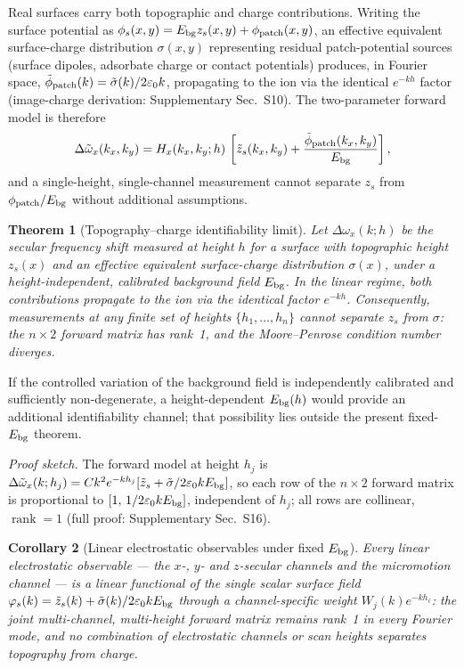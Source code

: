 \documentclass[12pt,a4paper]{article}
\newtheorem{theorem}{Theorem}[section]
\newtheorem{corollary}[theorem]{Corollary}
\begin{document}
Real surfaces carry both topographic and charge contributions.  Writing
the surface potential as
$\phi_s(x,y)=E_{\rm bg}z_s(x,y)+\phi_{\rm patch}(x,y)$, an effective
equivalent surface-charge distribution $\sigma(x,y)$ representing
residual patch-potential sources (surface dipoles, adsorbate charge or
contact potentials) produces, in Fourier space,
$\tilde{\phi}_{\rm patch}(k)=\tilde{\sigma}(k)/2\varepsilon_0 k$,
propagating to the ion via the identical $e^{-kh}$ factor
(image-charge derivation: Supplementary Sec.~S10).  The two-parameter
forward model is therefore
\begin{equation}
\Delta\tilde{\omega}_x(k_x,k_y) = H_x(k_x,k_y;h)\,
    \left[\tilde{z}_s(k_x,k_y) + \frac{\tilde{\phi}_{\rm patch}(k_x,k_y)}{E_{\rm bg}}\right],
\label{eq:forward_two_param}
\end{equation}
and a single-height, single-channel measurement cannot separate $z_s$
from $\phi_{\rm patch}/E_{\rm bg}$ without additional assumptions.

\begin{theorem}[Topography--charge identifiability limit]\label{thm:degeneracy}
Let $\Delta\omega_x(k;h)$ be the secular frequency shift
measured at height $h$ for a surface with topographic height $z_s(x)$ and
an effective equivalent surface-charge distribution $\sigma(x)$, under a
height-independent, calibrated background field $E_{\rm bg}$.  In
the linear regime, both
contributions propagate to the ion via the identical factor $e^{-kh}$.
Consequently, measurements at any finite set of heights $\{h_1, \ldots, h_n\}$
cannot separate $z_s$ from $\sigma$: the $n \times 2$ forward matrix has
rank~1, and the Moore--Penrose condition number diverges.
\end{theorem}

If the controlled variation of the background field is independently
calibrated and sufficiently non-degenerate, a height-dependent
$E_{\rm bg}(h)$ would provide an additional identifiability channel;
that possibility lies outside the present fixed-$E_{\rm bg}$ theorem.

\textit{Proof sketch.}  The forward model at height $h_j$ is
$\Delta\tilde{\omega}_x(k;h_j)=Ck^2e^{-kh_j}[\tilde{z}_s+\tilde{\sigma}/2\varepsilon_0 k E_{\rm bg}]$,
so each row of the $n\times2$ forward matrix is proportional to
$[1,\,1/2\varepsilon_0 k E_{\rm bg}]$, independent of $h_j$; all rows are
collinear, $\operatorname{rank}=1$ (full proof: Supplementary Sec.~S16).

\begin{corollary}[Linear electrostatic observables under fixed $E_{\rm bg}$]\label{cor:electrostatic}
Every linear electrostatic observable --- the
$x$-, $y$- and $z$-secular channels and the micromotion channel --- is a
linear functional of the single scalar surface field
$\varphi_s(k)=\tilde{z}_s(k)+\tilde{\sigma}(k)/2\varepsilon_0 k E_{\rm bg}$
through a channel-specific weight $W_j(k)e^{-kh_\ell}$: the joint
multi-channel, multi-height forward matrix remains rank~1 in every
Fourier mode, and no combination of electrostatic channels or scan
heights separates topography from charge.
\end{corollary}
\end{document}
